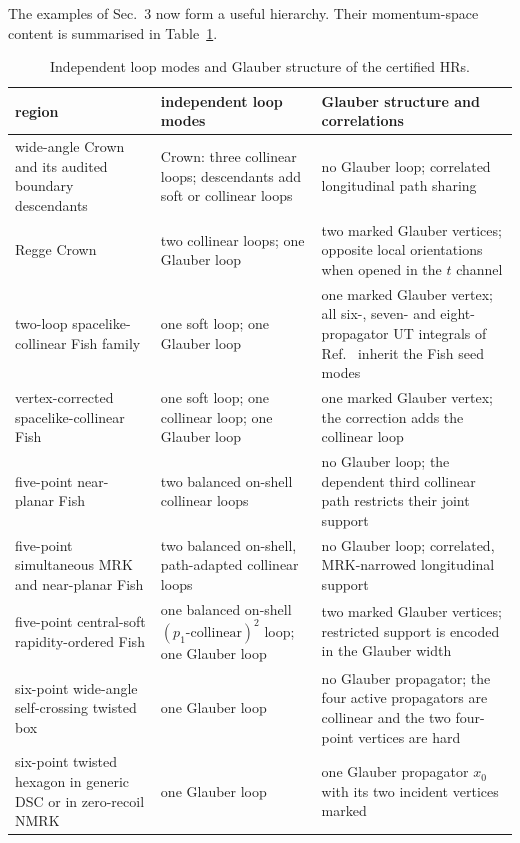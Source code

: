 \documentclass[a4paper,11pt]{article}
\begin{document}
The examples of Sec.~3 now form a useful hierarchy.  Their momentum-space
content is summarised in Table~\ref{tab:comparative-glauber-audit}.
\begin{table}[H]
\centering
\small
\begin{tabular}{@{}
 >{\raggedright\arraybackslash}p{}
 >{\raggedright\arraybackslash}p{}
 >{\raggedright\arraybackslash}p{}@{}}
\toprule
region & independent loop modes & Glauber structure and correlations\\
\midrule
wide-angle Crown~\cite{Gardi:2024axt} and its audited boundary descendants
& Crown: three collinear loops; descendants add soft or collinear loops
& no Glauber loop; correlated longitudinal path sharing\\
\addlinespace[.45em]
Regge Crown~\cite{Gardi:2024axt}
& two collinear loops; one Glauber loop
& two marked Glauber vertices; opposite local orientations
when opened in the \(t\) channel\\
\addlinespace[.45em]
two-loop spacelike-collinear Fish family
& one soft loop; one Glauber loop
& one marked Glauber vertex; all six-, seven- and eight-propagator UT integrals
of Ref.~\cite{Chen:2026dnj} inherit the Fish seed modes\\
\addlinespace[.45em]
vertex-corrected spacelike-collinear Fish
& one soft loop; one collinear loop; one Glauber loop
& one marked Glauber vertex; the correction adds the collinear loop\\
\addlinespace[.45em]
five-point near-planar Fish
& two balanced on-shell collinear loops
& no Glauber loop; the dependent third collinear path restricts their joint support\\
\addlinespace[.45em]
five-point simultaneous MRK and near-planar Fish
& two balanced on-shell, path-adapted collinear loops
& no Glauber loop; correlated, MRK-narrowed longitudinal support\\
\addlinespace[.45em]
five-point central-soft rapidity-ordered Fish
& one balanced on-shell \((p_1\text{-collinear})^2\) loop; one Glauber loop
& two marked Glauber vertices; restricted support is encoded in the Glauber width\\
\addlinespace[.45em]
six-point wide-angle self-crossing twisted box
& one Glauber loop
& no Glauber propagator; the four active propagators are collinear and the
two four-point vertices are hard\\
\addlinespace[.45em]
six-point twisted hexagon in generic DSC or in zero-recoil NMRK
& one Glauber loop
& one Glauber propagator \(x_0\) with its two incident vertices marked\\
\bottomrule
\end{tabular}
\caption{Independent loop modes and Glauber structure of the certified HRs.}
\label{tab:comparative-glauber-audit}
\end{table}
\end{document}
